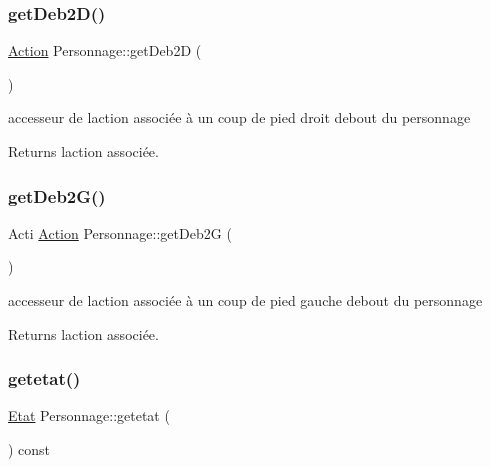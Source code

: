 \subsubsection{\texorpdfstring{get\+Deb2\+D()}{getDeb2D()}}
{\footnotesize\ttfamily \hyperlink{class_action}{Action} Personnage\+::get\+Deb2D (\begin{DoxyParamCaption}{ }\end{DoxyParamCaption})}



accesseur de l\textquotesingle{}action associée à un coup de pied droit debout du personnage 

\begin{DoxyReturn}{Returns}
l\textquotesingle{}action associée. 
\end{DoxyReturn}
\mbox{\label{class_personnage_a16e50e2bc84c18d08cd0128b8db0e999}} 
\subsubsection{\texorpdfstring{get\+Deb2\+G()}{getDeb2G()}}
{\footnotesize\ttfamily Acti \hyperlink{class_action}{Action} Personnage\+::get\+Deb2G (\begin{DoxyParamCaption}{ }\end{DoxyParamCaption})}



accesseur de l\textquotesingle{}action associée à un coup de pied gauche debout du personnage 

\begin{DoxyReturn}{Returns}
l\textquotesingle{}action associée. 
\end{DoxyReturn}
\mbox{\label{class_personnage_a91cd89d2c8b00aacae61437e8685ce67}} 
\subsubsection{\texorpdfstring{getetat()}{getetat()}}
{\footnotesize\ttfamily \hyperlink{class_etat}{Etat} Personnage\+::getetat (\begin{DoxyParamCaption}{ }\end{DoxyParamCaption}) const}



